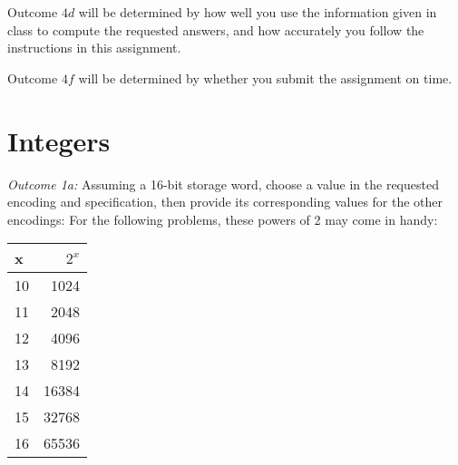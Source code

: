 \documentclass[11pt]{article}
\begin{document}
Outcome \(4d\) will be determined by how well you use the information given in class to compute
the requested answers, and how accurately you follow the instructions in this assignment.

Outcome \(4f\) will be determined by whether you submit the assignment on time.

\pagebreak

\section{Integers}

\emph{Outcome 1a:} Assuming a 16-bit storage word, choose a value in the requested encoding and
specification, then provide its corresponding values for the other encodings:
\linebreak \linebreak For the following problems, these powers of 2 may come in handy:
\begin{tabular}{ l | r }
	x & $2^{x}$ \\
	\hline
	10 & 1024 \\
	11 & 2048 \\
	12 & 4096 \\
	13 & 8192 \\
	14 & 16384 \\
	15 & 32768 \\
	16 & 65536
\end{tabular}
\end{document}
